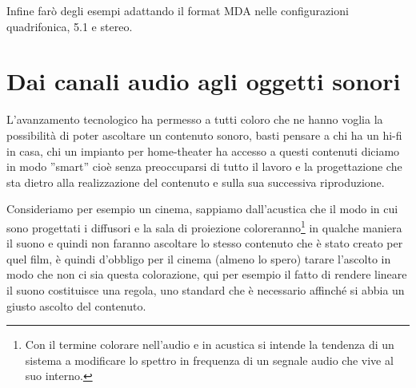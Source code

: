 \documentclass[12pt,a4paper]{report}
\begin{document}
Infine farò degli esempi adattando il format MDA nelle configurazioni quadrifonica, 5.1 e stereo.


\chapter{Dai canali audio agli oggetti sonori}



L'avanzamento tecnologico ha permesso a tutti coloro che ne hanno voglia la possibilità di poter ascoltare un contenuto sonoro, basti pensare a chi ha un hi-fi in casa, chi un impianto per home-theater %
ha accesso a questi contenuti diciamo in modo ''smart'' cioè senza preoccuparsi di tutto il lavoro e la progettazione che sta dietro alla realizzazione del contenuto e sulla sua successiva riproduzione. %

Consideriamo per esempio un cinema, sappiamo dall'acustica che il modo in cui sono progettati i diffusori e la sala di proiezione coloreranno\footnote{Con il termine colorare nell'audio e in acustica si intende la tendenza di un sistema a modificare lo spettro in frequenza di un segnale audio che vive al suo interno.} in qualche maniera il suono e quindi non faranno ascoltare lo stesso contenuto che è stato creato per quel film, è quindi d'obbligo per il cinema (almeno lo spero) tarare l'ascolto in modo che non ci sia questa colorazione, qui per esempio il fatto di rendere lineare il suono costituisce una regola, uno standard che è necessario affinché si abbia un giusto ascolto del contenuto.\\

\end{document}
